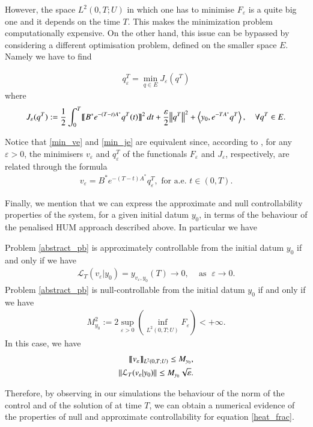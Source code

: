 However, the space $L^2(0,T;U)$ in which one has to minimise $F_\varepsilon$ is a quite big one and it depends on the time $T$. This makes the minimization problem computationally expensive. On the other hand, this issue can be bypassed by considering a different optimisation problem, defined on the smaller space $E$. Namely we have to find  

\begin{align}\label{min_je}
	q^T_\varepsilon=\min_{q\in E} J_\varepsilon (q^T)
\end{align}
where
\begin{align*}
	J_\varepsilon(q^T):=\frac{1}{2}\int_0^T\llbracket B^*e^{-(T-t)A^*}q^T(t)\rrbracket^2\,dt+\frac{\varepsilon}{2}{\left\|q^T\right\|}_{}^2 + \left\langle y_0,e^{-TA^*}q^T\right\rangle, \quad \forall q^T\in E.
\end{align*}

Notice that \eqref{min_ve} and \eqref{min_je} are equivalent since, according to \cite[Proosition 1.5]{boyer2013penalised}, for any $\varepsilon > 0$, the minimisers $v_\varepsilon$ and $q_\varepsilon^T$ of the functionals $F_\varepsilon$ and $J_\varepsilon$, respectively, are related through the formula
\begin{align*}
	v_\varepsilon = B^*e^{-(T-t)A^*}q_\varepsilon^T, \textrm{ for a.e. } t\in(0,T).
\end{align*} 

Finally, we mention that we can express the approximate and null controllability properties of the system, for a given initial datum $y_0$, in terms of the behaviour of the penalised HUM approach described above. In particular we have 

\begin{theorem}
Problem \eqref{abstract_pb} is approximately controllable from the initial datum $y_0$ if and only if we have
\begin{align}\label{approx_control_cond}
	\mathcal{L}_T(v_\varepsilon|y_0) = y_{v_\varepsilon,y_0}(T)\rightarrow 0,\;\;\;\textrm{ as }\;\varepsilon\to 0.
\end{align}
Problem \eqref{abstract_pb} is null-controllable from the initial datum $y_0$ if and only if we have
\begin{align}\label{null_control_cond}
	M_{y_0}^2:=2\sup_{\varepsilon>0}\left( \inf_{L^2(0,T;U)}F_\varepsilon\right)<+\infty.
\end{align}
In this case, we have 
\begin{align}\label{null_control_est}
	\llbracket v_\varepsilon\rrbracket_{L^2(0,T;U)}\leq M_{y_0},\nonumber
	\\
	{\left\|\mathcal L_T(v_\varepsilon|y_0)\right\|}_{}\leq M_{y_0}\sqrt{\varepsilon}.
\end{align} 
\end{theorem} 

Therefore, by observing in our simulations the behaviour of the norm of the control and of the solution of at time $T$, we can obtain a numerical evidence of the properties of null and approximate controllability for equation \eqref{heat_frac}. 